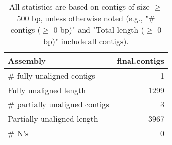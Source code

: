 \documentclass[12pt,a4paper]{article}
\begin{document}
\begin{table}[ht]
\begin{center}
\caption{All statistics are based on contigs of size $\geq$ 500 bp, unless otherwise noted (e.g., "\# contigs ($\geq$ 0 bp)" and "Total length ($\geq$ 0 bp)" include all contigs).}
\begin{tabular}{|l*{1}{|r}|}
\hline
Assembly & final.contigs \\ \hline
\# fully unaligned contigs & 1 \\ \hline
Fully unaligned length & 1299 \\ \hline
\# partially unaligned contigs & 3 \\ \hline
Partially unaligned length & 3967 \\ \hline
\# N's & 0 \\ \hline
\end{tabular}
\end{center}
\end{table}
\end{document}
